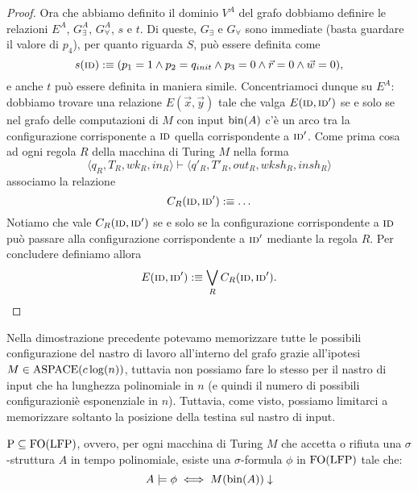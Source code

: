\begin{proof}
  Ora che abbiamo definito il dominio $V^A$ del grafo dobbiamo definire le
  relazioni $E^A$, $G_\exists^A$, $G_\forall^A$, $s$ e $t$. Di queste, $G_\exists$
  e $G_\forall$ sono immediate
  (basta guardare il valore di $p_4$), per quanto riguarda $S$, può essere
  definita come
  \[s(\textsc{id}) :\equiv (p_1=1 \land p_2 = q_{init} \land p_3=0 \land \vec{r}=0 \land \vec{w}=0),\]
  e anche $t$ può essere definita in maniera simile.
  Concentriamoci dunque su $E^A$: dobbiamo
  trovare una relazione $E(\vec{x},\vec{y})$ tale che
  valga $E(\textsc{id}, \textsc{id}')$ se e solo se nel grafo delle
  computazioni di $M$ con input $\operatorname{bin}(A)$ c'è un arco tra la configurazione
  corrisponente a $\textsc{id}$ quella corrispondente a $\textsc{id}'$.
  Come prima cosa ad ogni regola $R$ della macchina di Turing $M$ nella forma
  \[\langle q_R, T_R, wk_R, in_R \rangle \vdash
   \langle q'_R, T'_R, out_R, wksh_R, insh_R \rangle
  \]
  associamo la relazione
  \[C_R(\textsc{id}, \textsc{id}') :\equiv \ldots \]
  Notiamo che vale $C_R(\textsc{id}, \textsc{id}')$ se e solo se la configurazione corrispondente
  a $\textsc{id}$ può passare alla configurazione corrispondente a $\textsc{id}'$ mediante la regola
  $R$. Per concludere definiamo allora
  \[ E(\textsc{id}, \textsc{id}') :\equiv \bigvee_R C_R(\textsc{id}, \textsc{id}'). \]
\end{proof}

\begin{osservazione}
  Nella dimostrazione precedente potevamo
  memorizzare tutte le possibili configurazione del nastro di lavoro all'interno
  del grafo grazie all'ipotesi $M \in \operatorname{ASPACE}(c \log(n))$, tuttavia non possiamo
  fare lo stesso per il nastro di input che ha lunghezza
  polinomiale in $n$ (e quindi il numero di possibili configurazioniè esponenziale in $n$).
  Tuttavia, come visto, possiamo limitarci a memorizzare soltanto la posizione
  della testina sul nastro di input.
\end{osservazione}

\begin{corollario}
 $\operatorname{P} \subseteq \operatorname{FO}(\operatorname{LFP})$, ovvero, per ogni macchina di Turing $M$ che accetta o
 rifiuta una $\sigma$-struttura $A$ in tempo polinomiale, esiste una
 $\sigma$-formula $\phi$ in $\operatorname{FO}(\operatorname{LFP})$ tale che:
 \[ A \models \phi \iff M(\operatorname{bin}(A))\downarrow \]
\end{corollario}




